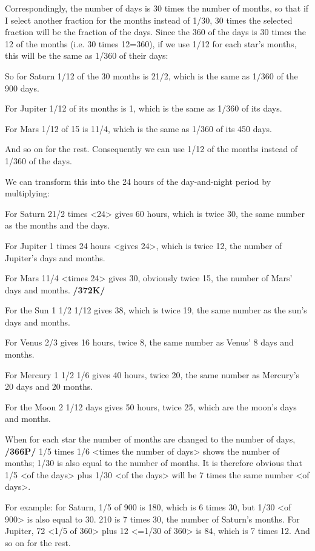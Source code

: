 Correspondingly, the number of days is 30 times the number of months, so that if I select another fraction for the months instead of 1/30, 30 times the selected fraction will be the fraction of the days. Since the 360 of the days is 30 times the 12 of the months (i.e. 30 times 12=360), if we use 1/12 for each star’s months, this will be the same as 1/360 of their days:

So for Saturn 1/12 of the 30 months is 21/2, which is the same as 1/360 of the 900 days.

For Jupiter 1/12 of its months is 1, which is the same as 1/360 of its days.

For Mars 1/12 of 15 is 11/4, which is the same as 1/360 of its 450 days.

And so on for the rest. Consequently we can use 1/12 of the months instead of 1/360 of the days. 

We can transform this into the 24 hours of the day-and-night period by multiplying:

For Saturn 21/2 times <24> gives 60 hours, which is twice 30, the same number as the months and the days.

For Jupiter 1 times 24 hours <gives 24>, which is twice 12, the number of Jupiter’s days and months.

For Mars 11/4 <times 24> gives 30, obviously twice 15, the number of Mars’ days and months. \textbf{/372K/} 

For the Sun 1 1/2 1/12 gives 38, which is twice 19, the same number as the sun’s days and months.

For Venus 2/3 gives 16 hours, twice 8, the same number as Venus’ 8 days and months.

For Mercury 1 1/2 1/6 gives 40 hours, twice 20, the same number as Mercury’s 20 days and 20 months.

For the Moon 2 1/12 days gives 50 hours, twice 25, which are the moon’s days and months.

When for each star the number of months are changed to the number of days, \textbf{/366P/} 1/5 times 1/6 <times the number of days> shows the number of months; 1/30 is also equal to the number of months. It is therefore obvious that 1/5 <of the days> plus 1/30 <of the days> will be 7 times the same number <of
days>. 

For example: for Saturn, 1/5 of 900 is 180, which is 6 times 30, but 1/30 <of 900> is also equal to 30. 210 is 7 times 30, the number of Saturn’s months. For Jupiter, 72 <1/5 of 360> plus 12 <=1/30
of 360> is 84, which is 7 times 12. And so on for the rest.

